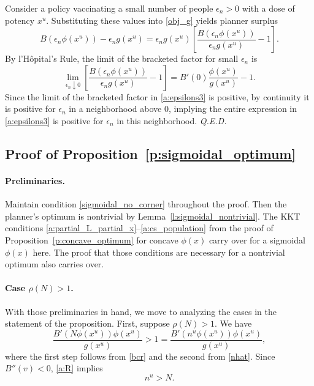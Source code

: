 \documentclass[12pt]{article}
\renewcommand{\qed}{{\it Q.E.D.}}
\newcommand{\efficacy}{\phi}
\newcommand{\general}{g}
\newcommand{\benefit}{B}
\newcommand{\ratio}{\rho(N)}
\newcommand{\xun}{x^{u}}
\newcommand{\nun}{n^{u}}
\newcommand{\en}{\epsilon_n}
\begin{document}
Consider a policy vaccinating a small number of people $\en > 0$ with
a dose of potency $\xun$. Substituting these values into \eqref{obj_g}
yields planner surplus
\begin{equation}
\label{a:epsilons3}
\benefit(\en \efficacy(\xun)) - \en \general(\xun) = \en \general(\xun) \left[
  \frac{\benefit(\en \efficacy(\xun))}{\en \general(\xun)} - 1 \right].
\end{equation}
By l'H\^{o}pital's Rule, the limit of the bracketed factor for small $\en$ is
\begin{equation}
\label{a:lHopital3}
\lim_{\en \downarrow 0} \left[ \frac{\benefit(\en \efficacy(\xun))}{\en \general(\xun)} - 1 \right] = \benefit'(0) \frac{\efficacy(\xun)}{\general(\xun)} - 1.  
\end{equation}
Since the limit of the bracketed factor in \eqref{a:epsilons3} is
positive, by continuity it is positive for $\en$ in a neighborhood
above 0, implying the entire expression in \eqref{a:epsilons3} is
positive for $\en$ in this neighborhood. \qed


\subsection*{Proof of Proposition~\ref{p:sigmoidal_optimum}}

\paragraph{Preliminaries.}

Maintain condition \eqref{sigmoidal_no_corner} throughout the
proof. Then the planner's optimum is nontrivial by
Lemma~\ref{l:sigmoidal_nontrivial}.  The KKT conditions
\eqref{a:partial_L_partial_x}--\eqref{a:cs_population} from the proof
of Proposition~\ref{p:concave_optimum} for concave $\efficacy(x)$
carry over for a sigmoidal $\efficacy(x)$ here. The proof that those
conditions are necessary for a nontrivial optimum also carries over.

\paragraph{Case $\ratio > 1$.}

With those preliminaries in hand, we move to analyzing the cases in
the statement of the proposition. First, suppose $\ratio > 1$.  We have
\begin{equation}
\label{a:R}
\frac{\benefit'(N \efficacy(\xun)) \efficacy(\xun)}{\general(\xun)} >
1 = \frac{\benefit'(\nun \efficacy(\xun))
  \efficacy(\xun)}{\general(\xun)},
\end{equation}
where the first step follows from \eqref{bcr} and the second from
\eqref{nhat}. Since $\benefit''(v) < 0$, \eqref{a:R} implies
\begin{equation}
\label{a:nugN}
\nun > N.
\end{equation} 
\end{document}
